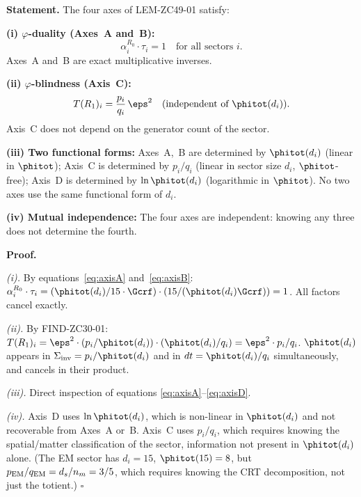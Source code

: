\documentclass[12pt, a4paper]{article}
\begin{document}
\begin{formalbox}[title={THM-ZC49-01: Four-Axis Duality Theorem}]
\textbf{Statement.}
The four axes of LEM-ZC49-01 satisfy:

\medskip
\textbf{(i) $\varphi$-duality (Axes~A and~B):}
\begin{equation}
  \alpha_i^{R_0} \cdot \tau_i = 1
  \quad\text{for all sectors } i.
  \label{eq:ab-dual}
\end{equation}
Axes~A and~B are exact multiplicative inverses.

\medskip
\textbf{(ii) $\varphi$-blindness (Axis~C):}
\begin{equation}
  T(R_1)_i = \frac{p_i}{q_i}\,\eps^2
  \quad\text{(independent of $\phitot(d_i)$).}
  \label{eq:c-blind}
\end{equation}
Axis~C does not depend on the generator count of the sector.

\medskip
\textbf{(iii) Two functional forms:}
Axes~A,~B are determined by $\phitot(d_i)$ (linear in $\phitot$);
Axis~C is determined by $p_i/q_i$ (linear in sector size $d_i$,
$\phitot$-free); Axis~D is determined by $\ln\phitot(d_i)$
(logarithmic in $\phitot$).
No two axes use the same functional form of $d_i$.

\medskip
\textbf{(iv) Mutual independence:}
The four axes are independent: knowing any three does not
determine the fourth.

\medskip
\textbf{Proof.}

\emph{(i).} By equations~\eqref{eq:axisA} and~\eqref{eq:axisB}:
$\alpha_i^{R_0}\cdot\tau_i
= (\phitot(d_i)/15\cdot\Gcrf)\cdot(15/(\phitot(d_i)\Gcrf))
= 1$.
All factors cancel exactly.

\emph{(ii).} By FIND-ZC30-01: $T(R_1)_i = \eps^2\cdot
(p_i/\phitot(d_i))\cdot(\phitot(d_i)/q_i) = \eps^2\cdot p_i/q_i$.
$\phitot(d_i)$ appears in $\Sigma_{\rm inv} = p_i/\phitot(d_i)$
and in $dt = \phitot(d_i)/q_i$ simultaneously, and cancels
in their product.

\emph{(iii).} Direct inspection of equations
\eqref{eq:axisA}--\eqref{eq:axisD}.

\emph{(iv).} Axis~D uses $\ln\phitot(d_i)$, which is
non-linear in $\phitot(d_i)$ and not recoverable from
Axes~A or~B. Axis~C uses $p_i/q_i$, which requires knowing
the spatial/matter classification of the sector, information
not present in $\phitot(d_i)$ alone. (The EM sector has
$d_i = 15$, $\phitot(15) = 8$, but $p_{\rm EM}/q_{\rm EM}
= d_s/n_m = 3/5$, which requires knowing the CRT decomposition,
not just the totient.) \hfill$\square$
\end{formalbox}
\end{document}
